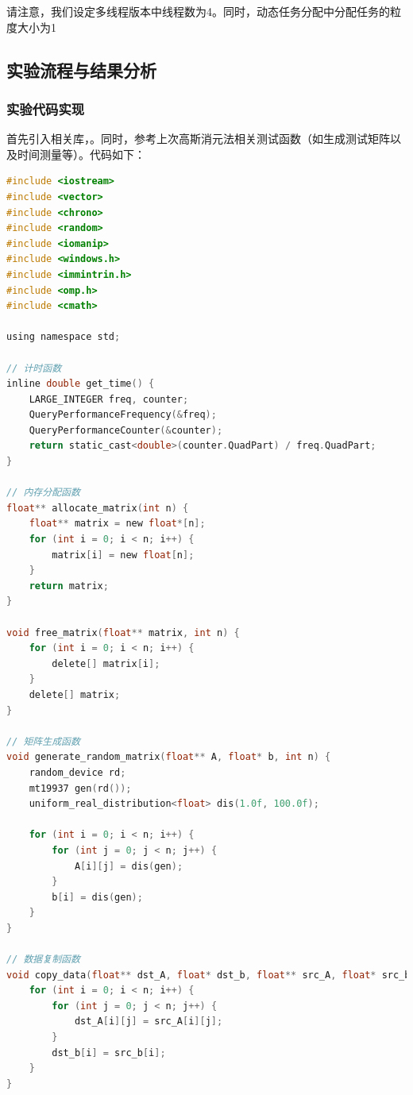\documentclass{nku}
\begin{document}
请注意，我们设定多线程版本中线程数为4。同时，动态任务分配中分配任务的粒度大小为1

\subsection{实验流程与结果分析}
\subsubsection{实验代码实现}
首先引入相关库，。同时，参考上次高斯消元法相关测试函数（如生成测试矩阵以及时间测量等）。代码如下：
\begin{lstlisting}[language=C]
#include <iostream>
#include <vector>
#include <chrono>
#include <random>
#include <iomanip>
#include <windows.h>
#include <immintrin.h>
#include <omp.h>
#include <cmath>

using namespace std;

// 计时函数
inline double get_time() {
    LARGE_INTEGER freq, counter;
    QueryPerformanceFrequency(&freq);
    QueryPerformanceCounter(&counter);
    return static_cast<double>(counter.QuadPart) / freq.QuadPart;
}

// 内存分配函数
float** allocate_matrix(int n) {
    float** matrix = new float*[n];
    for (int i = 0; i < n; i++) {
        matrix[i] = new float[n];
    }
    return matrix;
}

void free_matrix(float** matrix, int n) {
    for (int i = 0; i < n; i++) {
        delete[] matrix[i];
    }
    delete[] matrix;
}

// 矩阵生成函数
void generate_random_matrix(float** A, float* b, int n) {
    random_device rd;
    mt19937 gen(rd());
    uniform_real_distribution<float> dis(1.0f, 100.0f);

    for (int i = 0; i < n; i++) {
        for (int j = 0; j < n; j++) {
            A[i][j] = dis(gen);
        }
        b[i] = dis(gen);
    }
}

// 数据复制函数
void copy_data(float** dst_A, float* dst_b, float** src_A, float* src_b, int n) {
    for (int i = 0; i < n; i++) {
        for (int j = 0; j < n; j++) {
            dst_A[i][j] = src_A[i][j];
        }
        dst_b[i] = src_b[i];
    }
}
\end{lstlisting}
\end{document}
